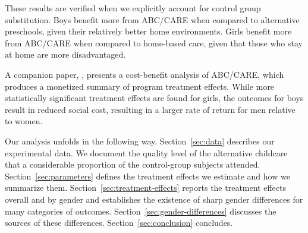 These results are verified when we explicitly account for control group substitution. Boys benefit more from ABC/CARE when compared to alternative preschools, given their relatively better home environments. Girls benefit more from ABC/CARE when compared to home-based care, given that those who stay at home are more disadvantaged. 


A companion paper, \citet{Garcia_Heckman_Leaf_etal_2017_Comp_CBA_Unpublished}, presents a cost-benefit analysis of ABC/CARE, which produces a monetized summary of program treatment effects. While more statistically significant treatment effects are found for girls, the outcomes for boys result in reduced social cost, resulting in a larger rate of return for men relative to women. 

Our analysis unfolds in the following way. Section~\ref{sec:data} describes our experimental data. We document the quality level of the alternative childcare that a considerable proportion of the control-group subjects attended. Section~\ref{sec:parameters} defines the treatment effects we estimate and how we summarize them. Section~\ref{sec:treatment-effects} reports the treatment effects overall and by gender and establishes the existence of sharp gender differences for many categories of outcomes. Section~\ref{sec:gender-differences} discusses the sources of these differences. Section~\ref{sec:conclusion} concludes.
